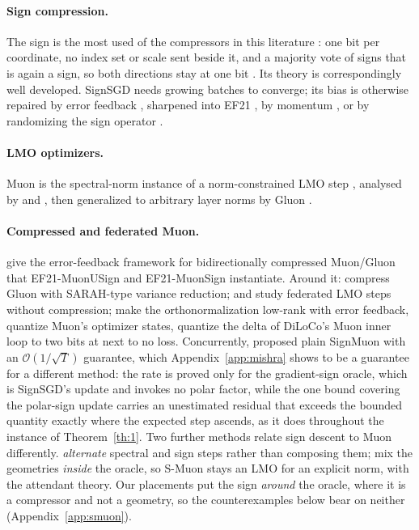 \paragraph{Sign compression.} The sign is the most used of the compressors in this literature \citep{alistarh2017qsgd,horvath2023stochastic,beznosikov2020biased}: one bit per coordinate, no index set or scale sent beside it, and a majority vote of signs that is again a sign, so both directions stay at one bit \citep{bernstein2019signsgdmajority}. Its theory is correspondingly well developed. SignSGD \citep{bernstein2018signsgd} needs growing batches to converge; its bias is otherwise repaired by error feedback \citep{seide20141bit,karimireddy2019efsign}, sharpened into EF21 \citep{richtarik2021ef21}, by momentum \citep{cutkosky2020momentum,sun2023signmomentum}, or by randomizing the sign operator \citep{chen2020median,safaryan2021ssdm,jin2024stosign}.

\paragraph{LMO optimizers.} Muon \citep{jordan2024muon} is the spectral-norm instance of a norm-constrained LMO step \citep{bernstein2024old,pethick2025training}, analysed by \citet{li2025note} and \citet{kovalev2025understanding}, then generalized to arbitrary layer norms by Gluon \citep{riabinin2025gluon}.

\paragraph{Compressed and federated Muon.} \citet{gruntkowska2025error} give the error-feedback framework for bidirectionally compressed Muon/Gluon that EF21-MuonUSign and EF21-MuonSign instantiate. Around it: \citet{qian2026communicationefficientgluon} compress Gluon with SARAH-type variance reduction; \citet{takezawa2025fedmuonfederatedlearningbiascorrected} and \citet{zhang2025fedmuon} study federated LMO steps without compression; \citet{ahn2025dion} make the orthonormalization low-rank with error feedback, \citet{gupta2025effective} quantize Muon's optimizer states, \citet{therien2025muloco} quantize the delta of DiLoCo's Muon inner loop \citep{douillard2024diloco} to two bits at next to no loss. Concurrently, \citet{mishra2026signmuon} proposed plain SignMuon with an $\mathcal{O}(1/\sqrt{T})$ guarantee, which Appendix~\ref{app:mishra} shows to be a guarantee for a different method: the rate is proved only for the gradient-sign oracle, which is SignSGD's update and invokes no polar factor, while the one bound covering the polar-sign update carries an unestimated residual that exceeds the bounded quantity exactly where the expected step ascends, as it does throughout the instance of Theorem~\ref{th:1}. Two further methods relate sign descent to Muon differently. \citet{bolatov2026lionmuon} \emph{alternate} spectral and sign steps rather than composing them; \citet{kravatskiy2025kyfannorms} mix the geometries \emph{inside} the oracle, so S-Muon stays an LMO for an explicit norm, with the attendant theory. Our placements put the sign \emph{around} the oracle, where it is a compressor and not a geometry, so the counterexamples below bear on neither (Appendix~\ref{app:smuon}).

